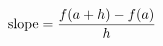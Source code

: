 \documentclass[preview]{standalone}
\begin{document}
\begin{align*}
\special{dvisvgm:raw <g id='unique000'>}\text{slope} = \frac{f(a+h) - f(a)}{h}\special{dvisvgm:raw </g>}
\end{align*}
\end{document}
